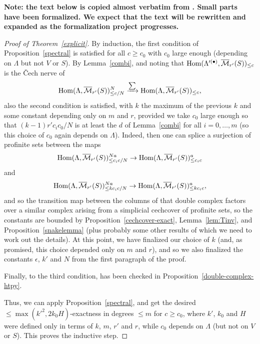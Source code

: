 \begin{remark}
  \label{boundary-text}
  \textbf{Note: the text below is copied almost verbatim from \cite{Analytic}.
  Small parts have been formalized.
  We expect that the text will be rewritten and expanded as the formalization project progresses.}
\end{remark}

\begin{proof}[Proof of Theorem~\ref{explicit}]

By induction, the first condition of Proposition~\ref{spectral} is satisfied for all $c\geq c_0$ with $c_0$ large enough (depending on $\Lambda$ but not $V$ or $S$). By Lemma~\ref{combi}, and noting that $\operatorname{Hom}(\Lambda'^{(\bullet)},\overline{\mathcal M}_{r'}(S))_{\leq c}$ is the \v{C}ech nerve of
\[
\operatorname{Hom}(\Lambda,\overline{\mathcal M}_{r'}(S))_{\leq c/N}^N\xrightarrow{\sum} \operatorname{Hom}(\Lambda,\overline{\mathcal M}_{r'}(S))_{\leq c},
\]
also the second condition is satisfied, with $k$ the maximum of the previous $k$ and some constant depending only on $m$ and $r$, provided we take $c_0$ large enough so that $(k-1)r'c_ic_0/N$ is at least the $d$ of Lemma~\ref{combi} for all $i=0,\ldots,m$ (so this choice of $c_0$ again depends on $\Lambda$). Indeed, then one can splice a surjection of profinite sets between the maps
\[
\operatorname{Hom}(\Lambda,\overline{\mathcal M}_{r'}(S))_{\leq c_ic/N}^{Na}\to\operatorname{Hom}(\Lambda,\overline{\mathcal M}_{r'}(S))_{\leq c_ic}^a
\]
and
\[
\operatorname{Hom}(\Lambda,\overline{\mathcal M}_{r'}(S))_{\leq kc_ic/N}^{Na}\to \operatorname{Hom}(\Lambda,\overline{\mathcal M}_{r'}(S))_{\leq kc_ic}^a,
\]
and so the transition map between the columns of that double complex factors over a similar complex arising from a simplicial cechcover of profinite sets, so the constants are bounded by Proposition~\ref{cechcover-exact},
	Lemma~\ref{lem:Tinv},
	and Proposition~\ref{snakelemma}
	(plus probably some other results of which we need to work out the details).
	At this point, we have finalized our choice of $k$ (and, as promised, this choice depended only on $m$ and $r$), and so we also finalized the constants $\epsilon$, $k'$ and $N$ from the first paragraph of the proof.

Finally, to the third condition, has been checked in Proposition~\ref{double-complex-htpy}.

Thus, we can apply Proposition~\ref{spectral}, and get the desired $\leq \max(k'^2,2k_0H)$-exactness in degrees $\leq m$ for $c\geq c_0$, where $k'$, $k_0$ and $H$ were defined only in terms of $k$, $m$, $r'$ and $r$, while $c_0$ depends on $\Lambda$ (but not on $V$ or $S$). This proves the inductive step.
\end{proof}

